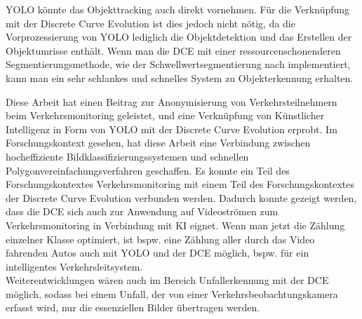 {{	YOLO könnte das Objekttracking auch direkt vornehmen. Für die Verknüpfung mit der Discrete Curve Evolution ist dies jedoch nicht nötig, da die Vorprozessierung von YOLO lediglich die Objektdetektion und das Erstellen der Objektumrisse enthält. Wenn man die DCE mit einer ressourcenschonenderen Segmentierungsmethode, wie der Schwellwertsegmentierung nach \citeauthor{Otsu1979} \cite{Otsu1979} implementiert, kann man ein sehr schlankes und schnelles System zu Objekterkennung erhalten.

	Diese Arbeit hat einen Beitrag zur Anonymisierung von Verkehrsteilnehmern beim Verkehrsmonitoring geleistet, und eine Verknüpfung von Künstlicher Intelligenz in Form von YOLO mit der Discrete Curve Evolution erprobt. Im Forschungskontext gesehen, hat diese Arbeit eine Verbindung zwischen hocheffiziente Bildklassifizierungssystemen und schnellen Polygonvereinfachungsverfahren geschaffen. Es konnte ein Teil des Forschungskontextes Verkehrsmonitoring mit einem Teil des Forschungskontextes der Discrete Curve Evolution verbunden werden. Dadurch konnte gezeigt werden, dass die DCE sich auch zur Anwendung auf Videoströmen zum Verkehrsmonitoring in Verbindung mit KI eignet. Wenn man jetzt  die Zählung einzelner Klasse optimiert, ist bspw. eine Zählung aller durch das Video fahrenden Autos auch mit YOLO und der DCE möglich, bspw. für ein intelligentes Verkehrsleitsystem. \\
	Weiterentwicklungen wären auch im Bereich Unfallerkennung mit der DCE möglich, sodass bei einem Unfall, der von einer Verkehrsbeobachtungskamera erfasst wird, nur die essenziellen Bilder übertragen werden. 



	
	}

}



